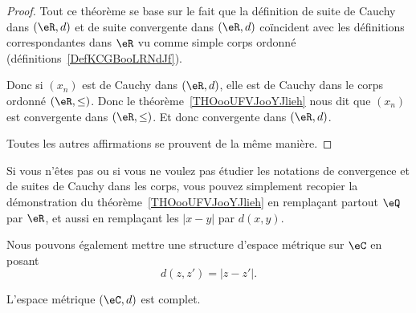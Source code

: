 \begin{proof}
	Tout ce théorème se base sur le fait que la définition de suite de Cauchy dans \( (\eR,d)\) et de suite convergente dans \( (\eR,d)\) coïncident avec les définitions correspondantes dans \( \eR\) vu comme simple corps ordonné (définitions~\ref{DefKCGBooLRNdJf}).

	Donc si \( (x_n)\) est de Cauchy dans \( (\eR,d)\), elle est de Cauchy dans le corps ordonné \( (\eR,\leq)\). Donc le théorème~\ref{THOooUFVJooYJlieh} nous dit que \( (x_n)\) est convergente dans \( (\eR,\leq)\). Et donc convergente dans \( (\eR,d)\).

	Toutes les autres affirmations se prouvent de la même manière.
\end{proof}

Si vous n'êtes pas  ou si vous ne voulez pas étudier les notations de convergence et de suites de Cauchy dans les corps, vous pouvez simplement recopier la démonstration du théorème~\ref{THOooUFVJooYJlieh} en remplaçant partout \( \eQ\) par \( \eR\), et aussi en remplaçant les \( | x-y |\) par \( d(x,y)\).

\begin{normaltext}
	Nous pouvons également mettre une structure d'espace métrique sur \( \eC\) en posant
	\begin{equation}
		d(z,z')=| z-z' |.
	\end{equation}
\end{normaltext}

\begin{proposition}         \label{PROPooOIQKooPtyXgm}
	L'espace métrique \( (\eC,d)\) est complet.
\end{proposition}

